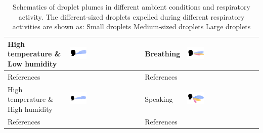 \documentclass[preprint,12pt]{elsarticle}
\DeclareRobustCommand{\legendsquare}[1]{%
  \tikz[baseline=(a.south)]{\node[#1, inner sep=.8ex, outer sep=0] (a) {};}%
  }
\begin{document}
\begin{table}[h!]
\begin{tabular}{|m{2.5cm}|m{3.5cm}||m{2.5cm}|m{3.5cm}|}
    \hline
    High temperature \& Low humidity & \includegraphics[clip,trim={0 2cm 0 2cm},width=0.25\textwidth]{Droplets/dropmat3.jpeg}& Breathing & \includegraphics[clip,trim={0 2cm 0 2cm},width=0.25\textwidth]{Droplets/dropmat7.jpeg} \\
    \hline
    References & \cite{zhang2019distribution,feng2020study,sen2021transmission} & References & \cite{he2011cfd,villafruela2019assessment,duill2021impact,shao2021risk,luo2022role,wang2022evaluation,wei2023effects} \\
    \hline
   High temperature \& High humidity & \includegraphics[clip,trim={0 2cm 0 2cm},width=0.25\textwidth]{Droplets/dropmat4.jpeg}& Speaking & \includegraphics[clip,trim={0 2cm 0 2cm},width=0.25\textwidth]{Droplets/dropmat8.jpeg} \\
    \hline
    References & \cite{zhang2019distribution,chong2021extended} & References & \cite{vuorinen2020modelling,zhou2021experimental,wang2022evaluation,wei2023effects} \\
    \hline
    \end{tabular}
    \caption{Schematics of droplet plumes in different ambient conditions and respiratory activity. The different-sized droplets expelled during different respiratory activities are shown as: \legendsquare{fill=resp} Small droplets \legendsquare{fill=vent} Medium-sized droplets \legendsquare{fill=therm} Large droplets }
    \label{tab:mat2}
\end{table}
\end{document}
